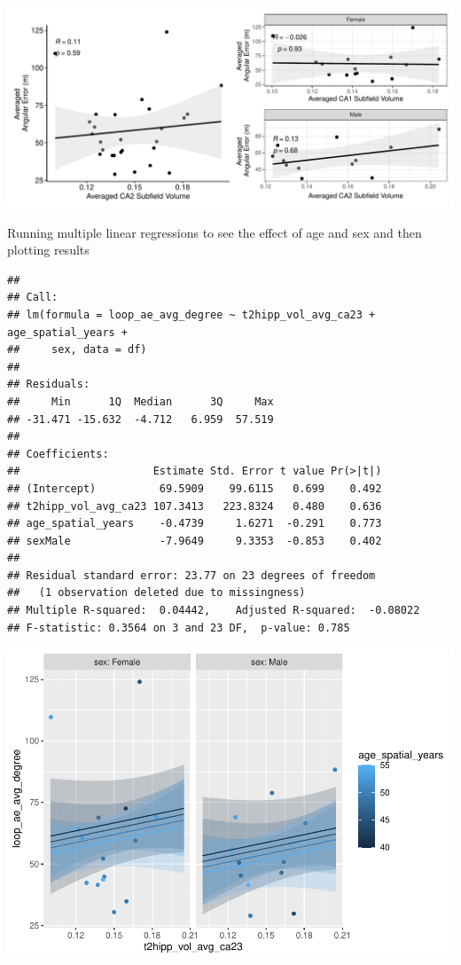 \documentclass[
]{article}
\begin{document}
~ \vspace{1cm}

\includegraphics{hippocampal_subfield_files/figure-latex/unnamed-chunk-2-1.pdf}

\vspace{1cm}

Running multiple linear regressions to see the effect of age and sex and
then plotting results

\begin{verbatim}
## 
## Call:
## lm(formula = loop_ae_avg_degree ~ t2hipp_vol_avg_ca23 + age_spatial_years + 
##     sex, data = df)
## 
## Residuals:
##     Min      1Q  Median      3Q     Max 
## -31.471 -15.632  -4.712   6.959  57.519 
## 
## Coefficients:
##                     Estimate Std. Error t value Pr(>|t|)
## (Intercept)          69.5909    99.6115   0.699    0.492
## t2hipp_vol_avg_ca23 107.3413   223.8324   0.480    0.636
## age_spatial_years    -0.4739     1.6271  -0.291    0.773
## sexMale              -7.9649     9.3353  -0.853    0.402
## 
## Residual standard error: 23.77 on 23 degrees of freedom
##   (1 observation deleted due to missingness)
## Multiple R-squared:  0.04442,    Adjusted R-squared:  -0.08022 
## F-statistic: 0.3564 on 3 and 23 DF,  p-value: 0.785
\end{verbatim}

\includegraphics{hippocampal_subfield_files/figure-latex/Avg CA2 + avg angular error MLR-1.pdf}
\end{document}
